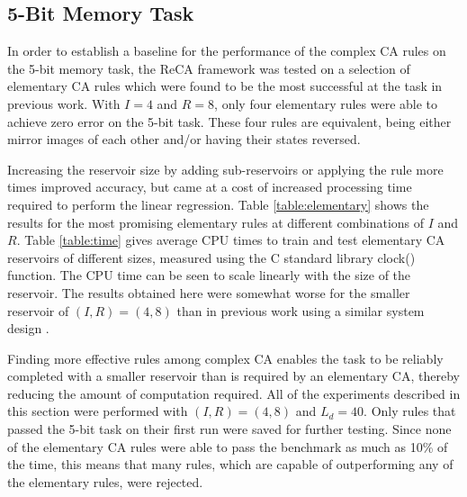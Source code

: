\documentclass{elsarticle}
\begin{document}
\begin{multicols}{2}
	\subsection{5-Bit Memory Task}
	In order to establish a baseline for the performance of the complex CA rules on 
	the 5-bit memory task, the ReCA framework was tested on a selection of 
	elementary CA rules which were found to be the most successful at the task 
	in previous work\cite{yilmaz2014reservoir}\cite{bye2016investigation}. With 
	$I = 4$ and $R = 8$, only four elementary rules were able to achieve zero 
	error on the 5-bit task. These four rules are equivalent, being either 
	mirror images of each other and/or having their states reversed.\par 
	Increasing the reservoir size by adding sub-reservoirs or applying the rule 
	more times improved accuracy, but came at a cost of increased processing 
	time required to perform the linear regression.  Table 
	\ref{table:elementary} shows the results for the most promising elementary 
	rules at different combinations of $I$ and $R$.  Table \ref{table:time} 
	gives average CPU times to train and test elementary CA reservoirs of different 
	sizes, measured using the C standard library clock() function. The CPU time 
	can be seen to scale linearly with the size of the reservoir. The results 
	obtained here were somewhat worse for the smaller reservoir of $(I,R) = 
	(4,8)$ than in previous work using a similar system design  
	\cite{yilmaz2014reservoir}\cite{bye2016investigation}\cite{nichele2017reservoir}.  
	\par Finding more effective rules among complex CA enables the task to be 
	reliably completed with a smaller reservoir than is required by an 
	elementary CA, thereby reducing the amount of computation required.  All of 
	the experiments described in this section were performed with $(I,R) = 
	(4,8)$ and $L_{d} = 40$.  Only rules that passed the 5-bit task on their 
	first run were saved for further testing.  Since none of the elementary CA 
	rules were able to pass the benchmark as much as 10\% of the time, this 
	means that many rules, which are capable of outperforming any of the 
	elementary rules, were rejected. 
	

\end{multicols}
\end{document}
